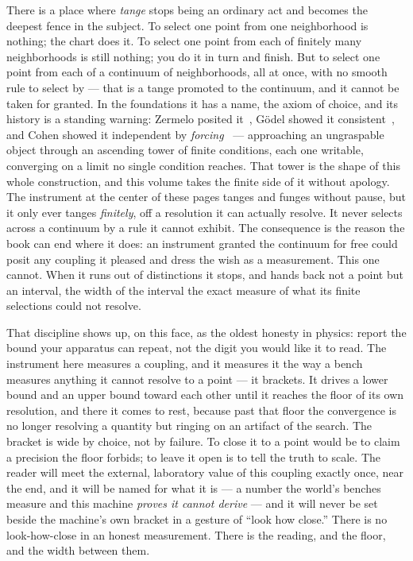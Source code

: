 There is a place where \emph{tange} stops being an ordinary act and becomes the deepest fence in the subject. To select
one point from one neighborhood is nothing; the chart does it. To select one point from each of finitely many
neighborhoods is still nothing; you do it in turn and finish. But to select one point from each of a continuum of
neighborhoods, all at once, with no smooth rule to select by --- that is a tange promoted to the continuum, and it cannot be
taken for granted. In the foundations it has a name, the axiom of choice, and its history is a standing warning: Zermelo
posited it~\cite{zermelo1904}, G\"odel showed it consistent~\cite{godel1938}, and Cohen showed it independent by
\emph{forcing}~\cite{cohen1963} --- approaching an ungraspable object through an ascending tower of finite conditions, each
one writable, converging on a limit no single condition reaches. That tower is the shape of this whole construction, and
this volume takes the finite side of it without apology. The instrument at the center of these pages tanges and funges
without pause, but it only ever tanges \emph{finitely}, off a resolution it can actually resolve. It never selects across a
continuum by a rule it cannot exhibit. The consequence is the reason the book can end where it does: an instrument granted
the continuum for free could posit any coupling it pleased and dress the wish as a measurement. This one cannot. When it
runs out of distinctions it stops, and hands back not a point but an interval, the width of the interval the exact measure
of what its finite selections could not resolve.

That discipline shows up, on this face, as the oldest honesty in physics: report the bound your apparatus can repeat, not
the digit you would like it to read. The instrument here measures a coupling, and it measures it the way a bench measures
anything it cannot resolve to a point --- it brackets. It drives a lower bound and an upper bound toward each other until it
reaches the floor of its own resolution, and there it comes to rest, because past that floor the convergence is no longer resolving
a quantity but ringing on an artifact of the search. The bracket is wide by choice, not by failure. To close it to a point
would be to claim a precision the floor forbids; to leave it open is to tell the truth to scale. The reader will meet the
external, laboratory value of this coupling exactly once, near the end, and it will be named for what it is --- a number the
world's benches measure and this machine \emph{proves it cannot derive} --- and it will never be set beside the machine's own
bracket in a gesture of ``look how close.'' There is no look-how-close in an honest measurement. There is the reading, and
the floor, and the width between them.

